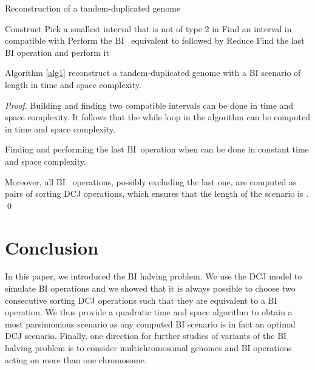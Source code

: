 \documentclass{llncs}
\def\BI{\ensuremath{\mbox{BI}}}
\begin{document}
\begin{algorithm}                      \caption{Reconstruction of a tandem-duplicated genome}          \label{alg1}                           \begin{algorithmic}[1]                    
\STATE Construct 
\STATE Pick a smallest interval  that is not of type 2 in 
\STATE Find an interval  in  compatible with 
\STATE Perform the \BI ~ equivalent to  followed by 
\STATE Reduce 
\ENDWHILE
{}
\STATE Find the last BI operation and perform it
\ENDIF
\end{algorithmic}
\end{algorithm}



\begin{theorem}

Algorithm \ref{alg1} reconstruct a tandem-duplicated genome with a BI scenario of length  in  time and space complexity.
\end{theorem}

\begin{proof}
Building  and finding two compatible intervals can be done in  time and space complexity. It follows that the while loop in the algorithm can be computed in  time and space complexity.



Finding and performing the last \BI~operation when   can be done in constant time and space complexity.

Moreover, all \BI~ operations, possibly excluding the last one, are computed as 
pairs of sorting DCJ operations, which ensures that the length of the scenario 
is . \qed
\end{proof}


\section{Conclusion}

In this paper, we introduced the BI halving problem. We use the DCJ model
to simulate BI operations and we showed that it is always possible to choose two consecutive 
sorting DCJ operations such that they are equivalent to a BI operation.
We thus provide a quadratic time and space algorithm to obtain a
most parsimonious scenario as any computed BI scenario is in fact an optimal DCJ scenario.
Finally, one direction for further studies of variants of the BI halving problem is to consider multichromosomal
genomes and BI operations acting on more than one chromosome.
 

\end{document}
